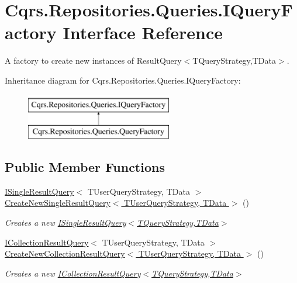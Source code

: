 \hypertarget{interfaceCqrs_1_1Repositories_1_1Queries_1_1IQueryFactory}{}\section{Cqrs.\+Repositories.\+Queries.\+I\+Query\+Factory Interface Reference}
\label{interfaceCqrs_1_1Repositories_1_1Queries_1_1IQueryFactory}


A factory to create new instances of Result\+Query$<$\+T\+Query\+Strategy,\+T\+Data$>$.  


Inheritance diagram for Cqrs.\+Repositories.\+Queries.\+I\+Query\+Factory\+:\begin{figure}[H]
\begin{center}
\leavevmode
\includegraphics[height=2.000000cm]{interfaceCqrs_1_1Repositories_1_1Queries_1_1IQueryFactory}
\end{center}
\end{figure}
\subsection*{Public Member Functions}
\begin{DoxyCompactItemize}
\item 
\hyperlink{interfaceCqrs_1_1Repositories_1_1Queries_1_1ISingleResultQuery}{I\+Single\+Result\+Query}$<$ T\+User\+Query\+Strategy, T\+Data $>$ \hyperlink{interfaceCqrs_1_1Repositories_1_1Queries_1_1IQueryFactory_a237aee0f99d8bfc03d8f10595f16ecea_a237aee0f99d8bfc03d8f10595f16ecea}{Create\+New\+Single\+Result\+Query$<$ T\+User\+Query\+Strategy, T\+Data $>$} ()
\begin{DoxyCompactList}\small\item\em Creates a new \hyperlink{interfaceCqrs_1_1Repositories_1_1Queries_1_1ISingleResultQuery}{I\+Single\+Result\+Query$<$\+T\+Query\+Strategy,\+T\+Data$>$} \end{DoxyCompactList}\item 
\hyperlink{interfaceCqrs_1_1Repositories_1_1Queries_1_1ICollectionResultQuery}{I\+Collection\+Result\+Query}$<$ T\+User\+Query\+Strategy, T\+Data $>$ \hyperlink{interfaceCqrs_1_1Repositories_1_1Queries_1_1IQueryFactory_af8b443851e8112dc70cbc7fe32029ccb_af8b443851e8112dc70cbc7fe32029ccb}{Create\+New\+Collection\+Result\+Query$<$ T\+User\+Query\+Strategy, T\+Data $>$} ()
\begin{DoxyCompactList}\small\item\em Creates a new \hyperlink{interfaceCqrs_1_1Repositories_1_1Queries_1_1ICollectionResultQuery}{I\+Collection\+Result\+Query$<$\+T\+Query\+Strategy,\+T\+Data$>$} \end{DoxyCompactList}\end{DoxyCompactItemize}



